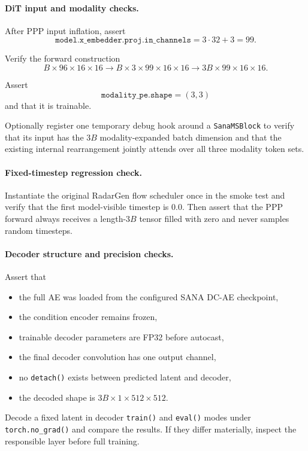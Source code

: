 \documentclass[11pt,a4paper]{article}
\begin{document}
\paragraph{DiT input and modality checks.}
After PPP input inflation, assert
\[
    \texttt{model.x\_embedder.proj.in\_channels}
    =
    3\cdot32+3
    =
    99.
\]

Verify the forward construction
\[
B\times96\times16\times16
\rightarrow
B\times3\times99\times16\times16
\rightarrow
3B\times99\times16\times16.
\]

Assert
\[
    \texttt{modality\_pe.shape}=(3,3)
\]
and that it is trainable.

Optionally register one temporary debug hook around a \texttt{SanaMSBlock} to verify that its input has the \(3B\) modality-expanded batch dimension and that the existing internal rearrangement jointly attends over all three modality token sets.

\paragraph{Fixed-timestep regression check.}
Instantiate the original RadarGen flow scheduler once in the smoke test and verify that the first model-visible timestep is \(0.0\). Then assert that the PPP forward always receives a length-\(3B\) tensor filled with zero and never samples random timesteps.

\paragraph{Decoder structure and precision checks.}
Assert that
\begin{itemize}
    \item the full AE was loaded from the configured SANA DC-AE checkpoint,
    \item the condition encoder remains frozen,
    \item trainable decoder parameters are FP32 before autocast,
    \item the final decoder convolution has one output channel,
    \item no \texttt{detach()} exists between predicted latent and decoder,
    \item the decoded shape is \(3B\times1\times512\times512\).
\end{itemize}

Decode a fixed latent in decoder \texttt{train()} and \texttt{eval()} modes under \texttt{torch.no\_grad()} and compare the results. If they differ materially, inspect the responsible layer before full training.
\end{document}

